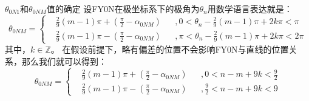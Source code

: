 \documentclass[aspectratio=169]{beamer}
\begin{document}
\begin{frame}{$\theta_{0N1}$和$\theta_{0NM}$值的确定}
    设FY0N在极坐标系下的极角为$\theta_n$用数学语言表达就是：
        \begin{equation}
            \theta_{0NM} = \left\{
            \begin{aligned}
                & \frac{2}{9}\left(m-1\right)\pi + \left(\frac{\pi}{2} - \alpha_{0NM}\right)&&,
                0 < \theta_n - \frac{2}{9}\left(m-1\right)\pi + 2k\pi< \pi\\
                & \frac{2}{9}(m-1)\pi - \left(\frac{\pi}{2} - \alpha_{0NM}\right)&&,
                \pi < \theta_n - \frac{2}{9}(m-1)\pi + 2k\pi < 2\pi
            \end{aligned}
            \right.
        \end{equation}
        其中，$k \in \mathbb{Z}$。
        在假设前提下，略有偏差的位置不会影响FY0N与直线的位置关系，那么我们就可以得到：
        \begin{equation}
            \theta_{0NM} = \left\{
            \begin{aligned}
                & \frac{2}{9}\left(m-1\right)\pi + \left(\frac{\pi}{2} - \alpha_{0NM}\right)&&,
                0 < n - m + 9k < \frac{9}{2}\\
                & \frac{2}{9}\left(m-1\right)\pi - \left(\frac{\pi}{2} - \alpha_{0NM}\right)&&,
                \frac{9}{2} < n - m + 9k < 9
            \end{aligned}
            \right.
        \end{equation}
\end{frame}
\end{document}
